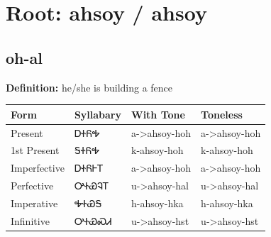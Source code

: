 \documentclass{article}%
\begin{document}
%
\normalsize%
\section*{Root: ahsoy / ahsoy}%
\subsection*{oh-al}%
\textbf{Definition: }%
he/she is building a fence%
\\[0.5em]%
\begin{tabular}{|l|l|l|l|}%
\hline%
\textbf{Form}&\textbf{Syllabary}&\textbf{With Tone}&\textbf{Toneless}\\%
\hline%
Present&ᎠᏐᏲᎭ&a{-}>ahsoy{-}hoh&a{-}>ahsoy{-}hoh\\%
1st Present&ᎦᏐᏲᎭ&k{-}ahsoy{-}hoh&k{-}ahsoy{-}hoh\\%
Imperfective&ᎠᏐᏲᎰᎢ&a{-}>ahsoy{-}hoh&a{-}>ahsoy{-}hoh\\%
Perfective&ᎤᏐᏯᎸᎢ&u{-}>ahsoy{-}hal&u{-}>ahsoy{-}hal\\%
Imperative&ᎭᏐᏯᎦ&h{-}ahsoy{-}hka&h{-}ahsoy{-}hka\\%
Infinitive&ᎤᏐᏯᏍᏗ&u{-}>ahsoy{-}hst&u{-}>ahsoy{-}hst\\%
\hline%
\end{tabular}%
\\[1em]%
\end{document}

